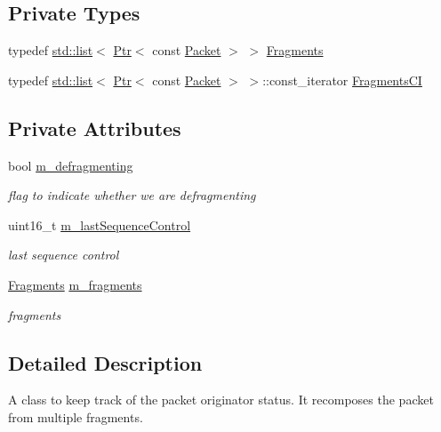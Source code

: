 \subsection*{Private Types}
\begin{DoxyCompactItemize}
\item 
typedef \hyperlink{openflow-interface_8h_afd9bcfa176617760671b67580f536fa7}{std\+::list}$<$ \hyperlink{classns3_1_1Ptr}{Ptr}$<$ const \hyperlink{classns3_1_1Packet}{Packet} $>$ $>$ \hyperlink{classns3_1_1OriginatorRxStatus_aa9654818900b22835483141ad512c697}{Fragments}
\item 
typedef \hyperlink{openflow-interface_8h_afd9bcfa176617760671b67580f536fa7}{std\+::list}$<$ \hyperlink{classns3_1_1Ptr}{Ptr}$<$ const \hyperlink{classns3_1_1Packet}{Packet} $>$ $>$\+::const\+\_\+iterator \hyperlink{classns3_1_1OriginatorRxStatus_aa79cf3435c25ec66e11879af39d531da}{Fragments\+CI}
\end{DoxyCompactItemize}
\subsection*{Private Attributes}
\begin{DoxyCompactItemize}
\item 
bool \hyperlink{classns3_1_1OriginatorRxStatus_aba12518d93f56f035bed9948a2d5c16a}{m\+\_\+defragmenting}
\begin{DoxyCompactList}\small\item\em flag to indicate whether we are defragmenting \end{DoxyCompactList}\item 
uint16\+\_\+t \hyperlink{classns3_1_1OriginatorRxStatus_a38d5f24b9ed9ca5760a66c349c83977c}{m\+\_\+last\+Sequence\+Control}
\begin{DoxyCompactList}\small\item\em last sequence control \end{DoxyCompactList}\item 
\hyperlink{classns3_1_1OriginatorRxStatus_aa9654818900b22835483141ad512c697}{Fragments} \hyperlink{classns3_1_1OriginatorRxStatus_a31ec8a9507d8619d38ef3a321a18d8bc}{m\+\_\+fragments}
\begin{DoxyCompactList}\small\item\em fragments \end{DoxyCompactList}\end{DoxyCompactItemize}


\subsection{Detailed Description}
A class to keep track of the packet originator status. It recomposes the packet from multiple fragments. 

